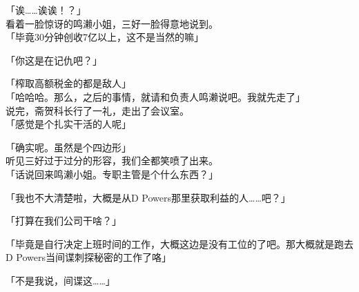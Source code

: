 「诶……诶诶！？」\\

看着一脸惊讶的鸣濑小姐，三好一脸得意地说到。\\

「毕竟30分钟创收7亿以上，这不是当然的嘛」

「你这是在记仇吧？」

「榨取高额税金的都是敌人」\\

「哈哈哈。那么，之后的事情，就请和负责人鸣濑说吧。我就先走了」\\

说完，斋贺科长行了一礼，走出了会议室。\\

「感觉是个扎实干活的人呢」

「确实呢。虽然是个四边形」\\

听见三好过于过分的形容，我们全都笑喷了出来。\\

「话说回来鸣濑小姐。专职主管是个什么东西？」

「我也不大清楚啦，大概是从D Powers那里获取利益的人……吧？」

「打算在我们公司干啥？」

「毕竟是自行决定上班时间的工作，大概这边是没有工位的了吧。那大概就是跑去D Powers当间谍刺探秘密的工作了咯」

「不是我说，间谍这……」\\

